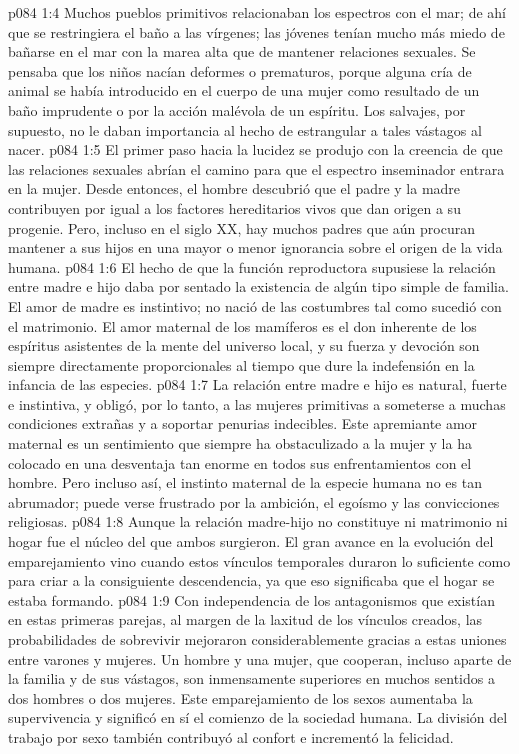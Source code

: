 \vs p084 1:4 Muchos pueblos primitivos relacionaban los espectros con el mar; de ahí que se restringiera el baño a las vírgenes; las jóvenes tenían mucho más miedo de bañarse en el mar con la marea alta que de mantener relaciones sexuales. Se pensaba que los niños nacían deformes o prematuros, porque alguna cría de animal se había introducido en el cuerpo de una mujer como resultado de un baño imprudente o por la acción malévola de un espíritu. Los salvajes, por supuesto, no le daban importancia al hecho de estrangular a tales vástagos al nacer.
\vs p084 1:5 El primer paso hacia la lucidez se produjo con la creencia de que las relaciones sexuales abrían el camino para que el espectro inseminador entrara en la mujer. Desde entonces, el hombre descubrió que el padre y la madre contribuyen por igual a los factores hereditarios vivos que dan origen a su progenie. Pero, incluso en el siglo XX, hay muchos padres que aún procuran mantener a sus hijos en una mayor o menor ignorancia sobre el origen de la vida humana.
\vs p084 1:6 \pc El hecho de que la función reproductora supusiese la relación entre madre e hijo daba por sentado la existencia de algún tipo simple de familia. El amor de madre es instintivo; no nació de las costumbres tal como sucedió con el matrimonio. El amor maternal de los mamíferos es el don inherente de los espíritus asistentes de la mente del universo local, y su fuerza y devoción son siempre directamente proporcionales al tiempo que dure la indefensión en la infancia de las especies.
\vs p084 1:7 La relación entre madre e hijo es natural, fuerte e instintiva, y obligó, por lo tanto, a las mujeres primitivas a someterse a muchas condiciones extrañas y a soportar penurias indecibles. Este apremiante amor maternal es un sentimiento que siempre ha obstaculizado a la mujer y la ha colocado en una desventaja tan enorme en todos sus enfrentamientos con el hombre. Pero incluso así, el instinto maternal de la especie humana no es tan abrumador; puede verse frustrado por la ambición, el egoísmo y las convicciones religiosas.
\vs p084 1:8 Aunque la relación madre\hyp{}hijo no constituye ni matrimonio ni hogar fue el núcleo del que ambos surgieron. El gran avance en la evolución del emparejamiento vino cuando estos vínculos temporales duraron lo suficiente como para criar a la consiguiente descendencia, ya que eso significaba que el hogar se estaba formando.
\vs p084 1:9 Con independencia de los antagonismos que existían en estas primeras parejas, al margen de la laxitud de los vínculos creados, las probabilidades de sobrevivir mejoraron considerablemente gracias a estas uniones entre varones y mujeres. Un hombre y una mujer, que cooperan, incluso aparte de la familia y de sus vástagos, son inmensamente superiores en muchos sentidos a dos hombres o dos mujeres. Este emparejamiento de los sexos aumentaba la supervivencia y significó en sí el comienzo de la sociedad humana. La división del trabajo por sexo también contribuyó al confort e incrementó la felicidad.

